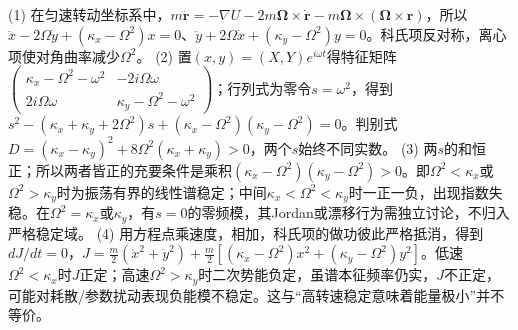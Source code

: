 (1) 在匀速转动坐标系中，\(m\ddot{\boldsymbol r}=-\nabla U-2m\boldsymbol\Omega\times\dot{\boldsymbol r}-m\boldsymbol\Omega\times(\boldsymbol\Omega\times\boldsymbol r)\)，所以\(\ddot x-2\Omega\dot y+(\kappa_x-\Omega^2)x=0\)、\(\ddot y+2\Omega\dot x+(\kappa_y-\Omega^2)y=0\)。科氏项反对称，离心项使对角曲率减少\(\Omega^2\)。
(2) 置\((x,y)=(X,Y)e^{i\omega t}\)得特征矩阵\(\begin{pmatrix}\kappa_x-\Omega^2-\omega^2&-2i\Omega\omega\\2i\Omega\omega&\kappa_y-\Omega^2-\omega^2\end{pmatrix}\)；行列式为零令\(s=\omega^2\)，得到\(s^2-(\kappa_x+\kappa_y+2\Omega^2)s+(\kappa_x-\Omega^2)(\kappa_y-\Omega^2)=0\)。判别式\(D=(\kappa_x-\kappa_y)^2+8\Omega^2(\kappa_x+\kappa_y)>0\)，两个\(s\)始终不同实数。
(3) 两\(s\)的和恒正；所以两者皆正的充要条件是乘积\((\kappa_x-\Omega^2)(\kappa_y-\Omega^2)>0\)。即\(\Omega^2<\kappa_x\)或\(\Omega^2>\kappa_y\)时为振荡有界的线性谱稳定；中间\(\kappa_x<\Omega^2<\kappa_y\)时一正一负，出现指数失稳。在\(\Omega^2=\kappa_x\)或\(\kappa_y\)，有\(s=0\)的零频模，其Jordan或漂移行为需独立讨论，不归入严格稳定域。
(4) 用方程点乘速度，相加，科氏项的做功彼此严格抵消，得到\(dJ/dt=0\)，\(J=\frac m2(\dot x^2+\dot y^2)+\frac m2[(\kappa_x-\Omega^2)x^2+(\kappa_y-\Omega^2)y^2]\)。低速\(\Omega^2<\kappa_x\)时\(J\)正定；高速\(\Omega^2>\kappa_y\)时二次势能负定，虽谱本征频率仍实，\(J\)不正定，可能对耗散/参数扰动表现负能模不稳定。这与“高转速稳定意味着能量极小”并不等价。

